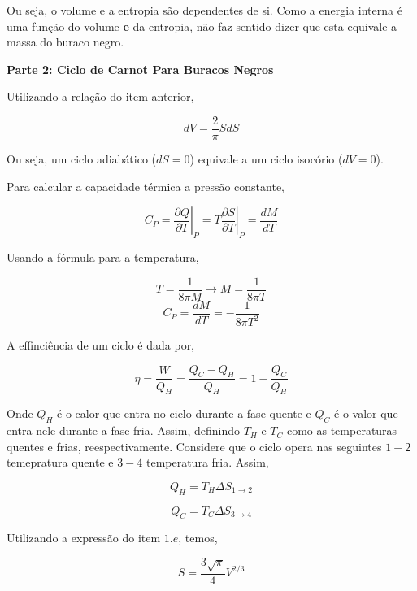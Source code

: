 \documentclass[11pt]{article}
\begin{document}
\begin{pproblem}
\begin{pssolution*}{}{}
\begin{alternativas}
            Ou seja, o volume e a entropia são dependentes de si. Como a energia interna é uma função do volume \textbf{e} da entropia, não faz sentido dizer que esta equivale a massa do buraco negro.
        \end{alternativas}
    
        \begin{center}
            \textbf{Parte 2: Ciclo de Carnot Para Buracos Negros}
        \end{center}

        \begin{alternativas}
            \item Utilizando a relação do item anterior, 
            
            \[dV = \frac{2}{\pi}S dS\]

            Ou seja, um ciclo adiabático (\(dS = 0\)) equivale a um ciclo isocório (\(dV = 0\)).

            \item Para calcular a capacidade térmica a pressão constante, 
            
            \[C_P = \left.\frac{\partial Q}{\partial T}\right\vert_P = T\left.\frac{\partial S}{\partial T}\right\vert_P = \frac{dM}{dT}\] 
            
            Usando a fórmula para a temperatura, 

            \[T = \frac{1}{8\pi M} \rightarrow M = \frac{1}{8\pi T}\]
            \[\boxed{C_P = \frac{dM}{dT} = -\frac{1}{8\pi T^2}}\]

            \item A effinciência de um ciclo é dada por, 

            \[\eta = \frac{W}{Q_H} = \frac{Q_C-Q_H}{Q_H} = 1-\frac{Q_C}{Q_H}\]

            Onde \(Q_H\) é o calor que entra no ciclo durante a fase quente e \(Q_C\) é o valor que entra nele durante a fase fria. Assim, definindo \(T_H\) e \(T_C\) como as temperaturas quentes e frias, reespectivamente. Considere que o ciclo opera nas seguintes \(1-2\) temepratura quente e \(3-4\) temperatura fria. Assim, 

            \[Q_H = T_H\Delta S_{1\rightarrow 2}\]

            \[Q_C = T_C\Delta S_{3\rightarrow 4}\]

            Utilizando a expressão do item \(1.e\), temos,

            \[S = \frac{3\sqrt{\pi}}{4}V^{2/3}\]


\end{alternativas}
\end{pssolution*}
\end{pproblem}
\end{document}
